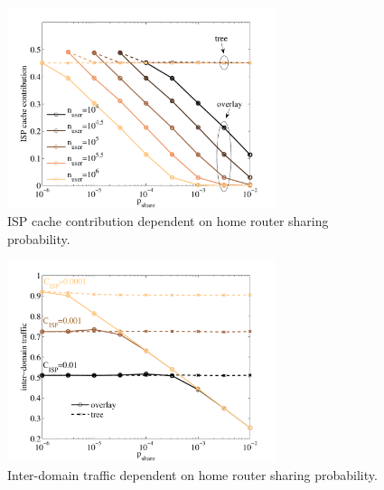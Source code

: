 \begin{figure}[tb]
  \centering
  \includegraphics[width=0.7\textwidth]{hierarchical/simulative/figures/overlay_nuser_ISPcontrib}
  \caption{ISP cache contribution dependent on home router sharing probability.}
  \label{fig:overlay_nuser_ISPcontrib}
\end{figure}

\begin{figure}[tb]
  \centering
  \includegraphics[width=0.7\textwidth]{hierarchical/simulative/figures/overlay_interdomain}
  \caption{Inter-domain traffic dependent on home router sharing probability.}
  \label{fig:overlay_interdomain}
\end{figure}



